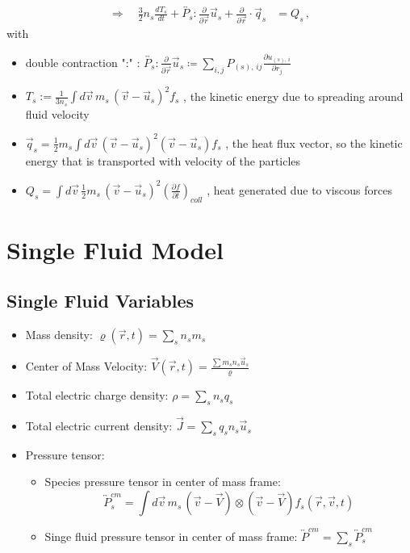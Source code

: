 \begin{align*}
\Rightarrow \quad \frac{3}{2} n_s \frac{d T_s}{d t} + \overleftrightarrow{P_s} : \frac{\partial}{\partial \vec{r}} \vec{u}_s + \frac{\partial}{\partial \vec{r}} \cdot \vec{q}_s &= Q_s  \, ,
\end{align*}
with
\begin{itemize}
\item double contraction ":" : $\overleftrightarrow{P_s} : \frac{\partial}{\partial \vec{r}} \vec{u}_s \coloneq \sum_{i,j} P_{(s),\, ij} \frac{\partial u_{(s),\, i}}{\partial r_j}$
\item $T_s := \frac{1}{3n_s} \int d\vec{v} \, m_s \, (\vec{v} - \vec{u}_s)^2 f_s$ \quad, \quad the kinetic energy due to spreading around fluid velocity

\item $\vec{q}_s = \frac{1}{2} m_s \int d\vec{v} \, (\vec{v} - \vec{u}_s)^2 (\vec{v} - \vec{u}_s) f_s$ \quad, \quad the heat flux vector, so the kinetic energy that is transported with velocity of the particles

\item $Q_s = \int d\vec{v} \, \frac{1}{2} m_s \, (\vec{v} - \vec{u}_s)^2 \left(\frac{\partial f}{\partial t}\right)_{coll}$ \quad, \quad heat generated due to viscous forces
\end{itemize}


\section{Single Fluid Model}
\subsection{Single Fluid Variables}
\begin{itemize}
    \item Mass density: $\varrho(\vec{r}, t) = \sum_s n_s m_s$
    \item Center of Mass Velocity: $\vec{V}(\vec{r}, t) = \frac{\sum m_s n_s \vec{u}_s}{\varrho}$
    \item Total electric charge density: $\rho = \sum_s n_s q_s$
    \item Total electric current density: $\vec{J} = \sum_s q_s n_s \vec{u}_s$
    \item Pressure tensor:
    \begin{itemize}
        \item Species pressure tensor in center of mass frame: \[\overleftrightarrow{P}_s^{cm} = \int d\vec{v} \,m_s\, (\vec{v}-\vec{V}) \otimes (\vec{v}-\vec{V}) f_s(\vec{r},\vec{v},t) \]
        \item Singe fluid pressure tensor in center of mass frame: $\overleftrightarrow{P}^{cm} = \sum_s \overleftrightarrow{P}_s^{cm}$
    \end{itemize} 
\end{itemize}


